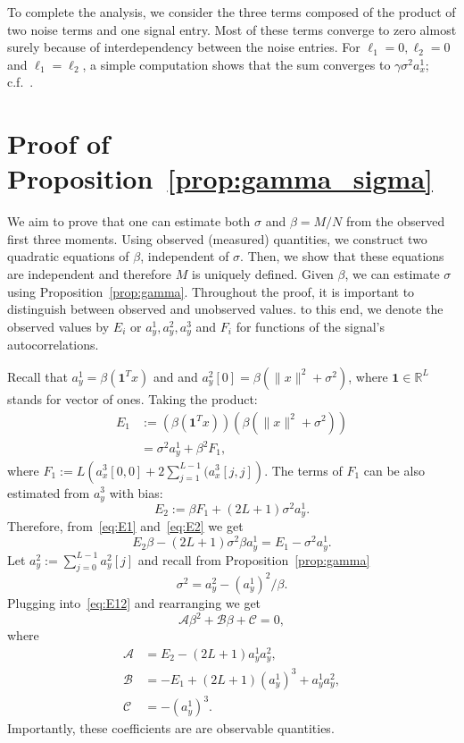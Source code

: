 \documentclass[english,11pt]{article}
\numberwithin{equation}{section}
\theoremstyle{plain}
\theoremstyle{definition}
\theoremstyle{remark}
\theoremstyle{plain}
\theoremstyle{remark}
\theoremstyle{plain}
\theoremstyle{plain}
\newcommand{\RL}{\mathbb{R}^L}
\newcommand{\one}{\mathbf{1}}
\begin{document}
To complete the analysis, we consider the three terms composed of the product of two noise terms and one signal entry. Most of these terms converge to zero almost surely because of interdependency between the noise entries. For $\ell_1=0, \ell_2=0$ and $\ell_1=\ell_2$,  a simple computation shows that the sum converges to $\gamma\sigma^2a_x^1$; c.f.~\cite{boumal2017heterogeneous}.



\section{Proof of Proposition~\ref{prop:gamma_sigma}} \label{sec:proof_prop_gamma_sigma}

We aim to prove that one can estimate both $\sigma$ and $\beta = M/N$ from the observed first three moments.
Using observed (measured) quantities, we construct two quadratic equations of $\beta$, independent of $\sigma$.
Then, we show that these equations are independent and therefore $M$ is uniquely defined. 
Given $\beta$, we can estimate $\sigma$ using Proposition~\ref{prop:gamma}.
Throughout the proof, it is important to distinguish between observed and unobserved values. 
to this end, we denote the observed values by $E_i$ or $a_y^1,a_y^2,a_y^3$ and $F_i$ for functions of the signal's autocorrelations. 


Recall that $a_y^1 = \beta(\one^Tx)$ and  
and $a_y^2[0] = \beta(\|x\|^2+\sigma^2)$, where $\one\in\RL$ stands for vector of ones. Taking the product:
\begin{equation}\label{eq:E1}
\begin{split}
E_1 &:= (\beta(\one^Tx))(\beta(\|x\|^2+\sigma^2)) \\
& = \sigma^2a_y^1 + \beta^2F_1,
 \end{split}
\end{equation}
where $F_1 := L\left(a_x^3[0,0] + 2\sum_{j=1}^{L-1}(a_x^3[j,j]\right)$. 
The terms of $F_1$ can be also estimated from $a_y^3$ with bias:
\begin{equation} \label{eq:E2}
E_2:= \beta F_1 + (2L+1)\sigma^2a_y^1.
\end{equation}
Therefore, from~\eqref{eq:E1} and~\eqref{eq:E2} we get
\begin{equation} \label{eq:E12}
E_2\beta -(2L+1)\sigma^2\beta a_y^1 = E_1-\sigma^2a_y^1.
\end{equation}
Let $a_y^2:=\sum_{j=0}^{L-1}a_y^2[j]$ and recall from Proposition~\ref{prop:gamma}
\begin{equation} \label{eq:sigma2}
\sigma^2 = a_y^2 - (a^1_y)^2/\beta. 
\end{equation} 
Plugging into~\eqref{eq:E12} and rearranging we get 
\begin{equation} \label{eq:quad1}
\mathcal{A}\beta^2 + \mathcal{B}\beta + \mathcal{C} = 0,
\end{equation}
where 
\begin{align*}
\mathcal{A} &= E_2 - (2L+1)a_y^1a_y^2, \\ 
\mathcal{B} &= -E_1 + (2L+1)(a_y^1)^3 + a_y^1a_y^2  , \\
\mathcal{C} &= -(a_y^1)^3.
\end{align*}
Importantly, these coefficients are are observable quantities. 
\end{document}

